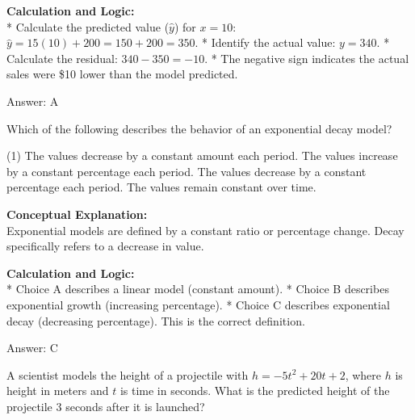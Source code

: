 \documentclass[11pt,paper=a4,answers]{exam}
\begin{document}
\begin{questions}
\begin{solution}
\vspace{30pt}

\textbf{Calculation and Logic:} \\
* Calculate the predicted value ($\hat{y}$) for $x = 10$: $\hat{y} = 15(10) + 200 = 150 + 200 = 350$.
* Identify the actual value: $y = 340$.
* Calculate the residual: $340 - 350 = -10$.
* The negative sign indicates the actual sales were \$10 lower than the model predicted.

\vspace{30pt}

Answer: \colorbox{yellow!100}{A}
\end{solution}

\vspace{60pt}

\question
Which of the following describes the behavior of an exponential decay model?
\begin{tasks}(1)
    \task The values decrease by a constant amount each period.
    \task The values increase by a constant percentage each period.
    \task The values decrease by a constant percentage each period.
    \task The values remain constant over time.
\end{tasks}

\begin{solution}
\textbf{Conceptual Explanation:} \\
Exponential models are defined by a constant ratio or percentage change. Decay specifically refers to a decrease in value.

\vspace{30pt}

\textbf{Calculation and Logic:} \\
* Choice A describes a linear model (constant amount).
* Choice B describes exponential growth (increasing percentage).
* Choice C describes exponential decay (decreasing percentage). This is the correct definition.

\vspace{30pt}

Answer: \colorbox{yellow!100}{C}
\end{solution}

\vspace{60pt}

\question
A scientist models the height of a projectile with $h = -5t^2 + 20t + 2$, where $h$ is height in meters and $t$ is time in seconds. What is the predicted height of the projectile 3 seconds after it is launched?


\end{questions}
\end{document}
